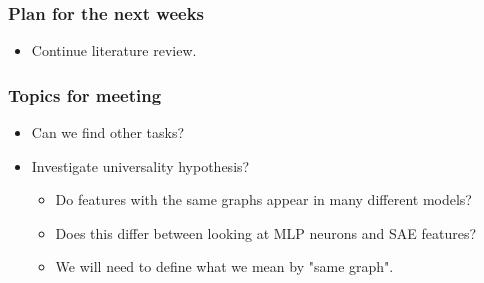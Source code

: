\documentclass[aspectratio=169]{beamer}
\begin{document}
\begin{frame}[fragile=singleslide]
    \frametitle{Plan for the next weeks}
    \begin{itemize}
        \item Continue literature review.
    \end{itemize}
\end{frame}
\begin{frame}[fragile=singleslide]
    \frametitle{Topics for meeting}
    \begin{itemize}
        \item Can we find other tasks?
        \item Investigate universality hypothesis?
        \begin{itemize}
            \item Do features with the same graphs appear in many different models?
            \item Does this differ between looking at MLP neurons and SAE features?
            \item We will need to define what we mean by "same graph".
        \end{itemize}
    \end{itemize}
\end{frame}
\end{document}
